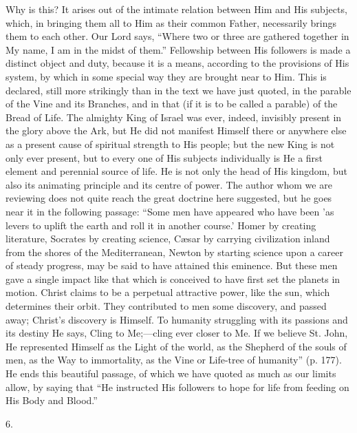 Why is this? It arises out of the intimate
relation between Him and His subjects, which, in bringing them all to
Him as their common Father, necessarily brings them to each other. Our
Lord says, ``Where two or three are gathered together in My name, I am
in the midst of them.'' Fellowship between His followers is made a
distinct object and duty, because it is a means, according to the
provisions of His system, by which in some special way they are
brought near to Him. This is declared, still more strikingly than in
the text we have just quoted, in the parable of the Vine and its
Branches, and in that (if it is to be called a parable) of the Bread
of Life. The almighty King of Israel was ever, indeed, invisibly
present in the glory above the Ark, but He did not manifest Himself
there or anywhere else as a present cause of spiritual strength to His
people; but the new King is not only ever present, but to every one of
His subjects individually is He a first element and perennial source
of life. He is not only the head of His kingdom, but also its
animating principle and its centre of power. The author whom we are
reviewing does not quite reach the great doctrine here suggested, but
he goes near it in the following passage: ``Some men have
appeared who have been 'as levers to uplift the earth and roll it in
another course.' Homer by creating literature, Socrates by creating
science, Cæsar by carrying civilization inland from the shores of the
Mediterranean, Newton by starting science upon a career of steady
progress, may be said to have attained this eminence. But these men
gave a single impact like that which is conceived to have first set
the planets in motion. Christ claims to be a perpetual attractive
power, like the sun, which determines their orbit. They contributed to
men some discovery, and passed away; Christ's discovery is Himself. To
humanity struggling with its passions and its destiny He says, Cling
to Me;—cling ever closer to Me. If we believe St. John, He
represented Himself as the Light of the world, as the Shepherd of the
souls of men, as the Way to immortality, as the Vine or Life-tree of
humanity'' (p. 177). He ends this beautiful passage, of which we have
quoted as much as our limits allow, by saying that ``He instructed His
followers to hope for life from feeding on His Body and Blood.''

6.

